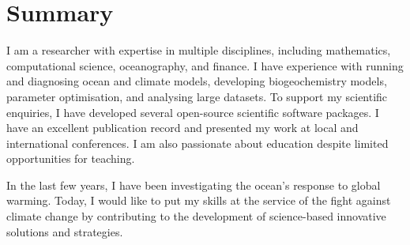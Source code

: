 \section{Summary}

I am a researcher with expertise in multiple disciplines, including mathematics, computational science, oceanography, and finance.
I have experience with running and diagnosing ocean and climate models, developing biogeochemistry models, parameter optimisation, and analysing large datasets.
To support my scientific enquiries, I have developed several open-source scientific software packages.
I have an excellent publication record and presented my work at local and international conferences.
I am also passionate about education despite limited opportunities for teaching.

In the last few years, I have been investigating the ocean's response to global warming.
Today, I would like to put my skills at the service of the fight against climate change by contributing to the development of science-based innovative solutions and strategies.

